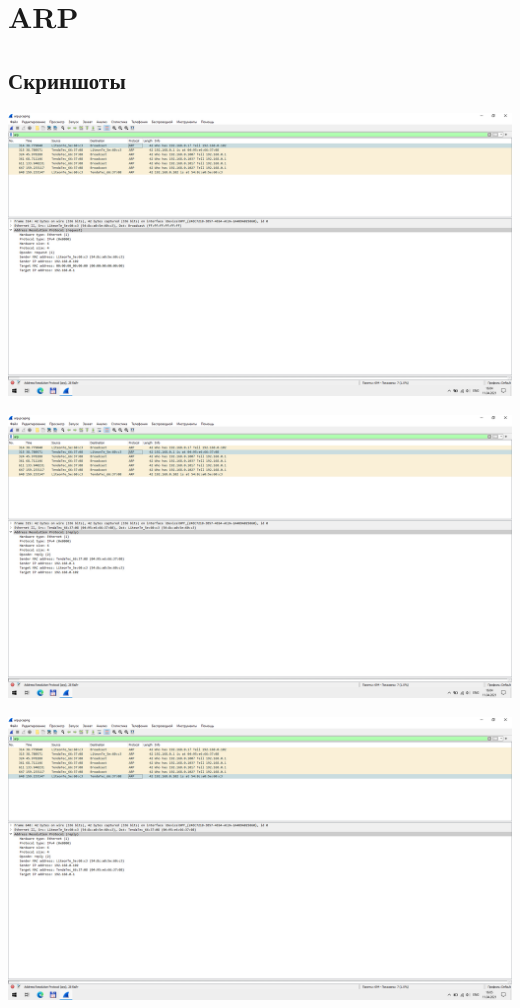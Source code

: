 
\section{ARP}

\subsection{Скриншоты}

\begin{center}

    \includegraphics[width=\textwidth]{screenshots/arp_request_1}

    \includegraphics[width=\textwidth]{screenshots/arp_response_1}

    \includegraphics[width=\textwidth]{screenshots/arp_setup_1}

\end{center}

